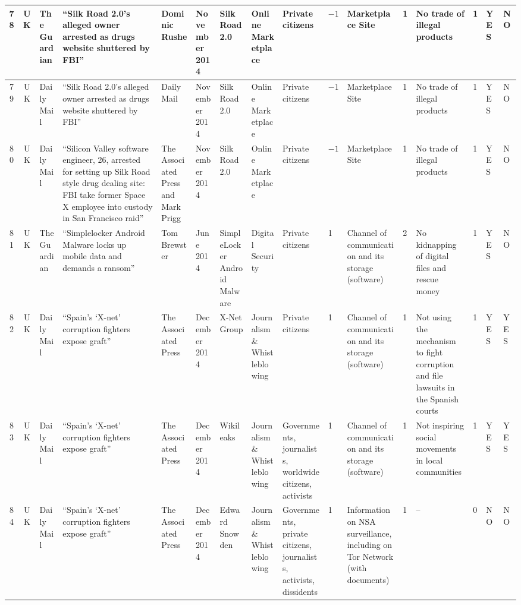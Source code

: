 \begin{landscape}
{\begin{longtable}{|c|c|p{1.2cm}|p{2.5cm}|p{1.4cm}|p{1.2cm}|p{1.4cm}|p{1.2cm}|p{1.8cm}|p{0.4cm}|p{1.8cm}|p{0.4cm}|p{1.5cm}|p{0.4cm}|p{0.6cm}|p{0.6cm}|}
\hline
78 & UK & The Guardian & ``Silk Road 2.0's alleged owner arrested as drugs website shuttered by FBI'' & Dominic Rushe & November 2014 &Silk Road 2.0 & Online Marketplace & Private citizens & $-1$ & Marketplace Site & 1 & No trade of illegal products & 1 & YES & NO \\
\hline
79 & UK & Daily Mail & ``Silk Road 2.0's alleged owner arrested as drugs website shuttered by FBI'' & Daily Mail & November 2014 &Silk Road 2.0 & Online Marketplace & Private citizens & $-1$ & Marketplace Site & 1 & No trade of illegal products & 1 & YES & NO \\
\hline
80 & UK & Daily Mail & ``Silicon Valley software engineer, 26, arrested for setting up Silk Road style drug dealing site: FBI take former Space X employee into custody in San Francisco raid'' & The Associated Press and Mark Prigg & November 2014 &Silk Road 2.0 & Online Marketplace & Private citizens & $-1$ & Marketplace Site & 1 & No trade of illegal products & 1 & YES & NO \\
\hline
81 & UK & The Guardian & ``Simplelocker Android Malware locks up mobile data and demands a ransom'' & Tom Brewster & June 2014 &SimpleLocker Android Malware & Digital Security & Private citizens & 1 & Channel of communication and its storage (software) & 2 & No kidnapping of digital files and rescue money & 1 & YES & NO \\
\hline
82 & UK & Daily Mail & ``Spain's `X-net' corruption fighters expose graft'' & The Associated Press & December 2014 &X-Net Group & Journalism \& Whistleblowing & Private citizens & 1 & Channel of communication and its storage (software) & 1 & Not using the mechanism to fight corruption and file lawsuits in the Spanish courts & 1 & YES & YES \\
\hline
83 & UK & Daily Mail & ``Spain's `X-net' corruption fighters expose graft'' & The Associated Press & December 2014 &Wikileaks & Journalism \& Whistleblowing & Governments, journalists, worldwide citizens, activists & 1 & Channel of communication and its storage (software) & 1 & Not inspiring social movements in local communities & 1 & YES & YES \\
\hline
84 & UK & Daily Mail & ``Spain's `X-net' corruption fighters expose graft'' & The Associated Press & December 2014 &Edward Snowden & Journalism \& Whistleblowing & Governments, private citizens, journalists, activists, dissidents & 1 & Information on NSA surveillance, including on Tor Network (with documents) & 1 & -- & 0 & NO & NO \\
\hline

\end{longtable}}
\end{landscape}
